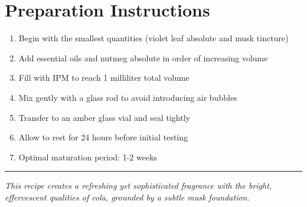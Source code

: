 \documentclass{article}
\begin{document}
\section*{Preparation Instructions}
\begin{enumerate}
  \item Begin with the smallest quantities (violet leaf absolute and musk tincture)
  \item Add essential oils and nutmeg absolute in order of increasing volume
  \item Fill with IPM to reach 1 milliliter total volume
  \item Mix gently with a glass rod to avoid introducing air bubbles
  \item Transfer to an amber glass vial and seal tightly
  \item Allow to rest for 24 hours before initial testing
  \item Optimal maturation period: 1-2 weeks
\end{enumerate}

\vspace{1cm}
\begin{center}
\textcolor{colaBrown}{\rule{0.8\textwidth}{0.4pt}}
\end{center}

\begin{center}
\textit{\textcolor{colaDark}{This recipe creates a refreshing yet sophisticated fragrance with the bright, 
effervescent qualities of cola, grounded by a subtle musk foundation.}}
\end{center}
\end{document}
